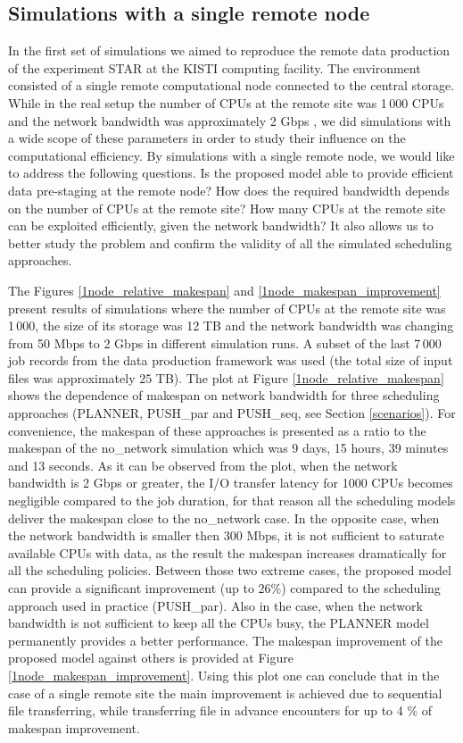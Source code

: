 \documentclass{svjour3}                     %
\begin{document}
\subsection{Simulations with a single remote node}
In the first set of simulations we aimed to reproduce the remote data production of the experiment STAR at the KISTI computing facility. The environment consisted of a single remote computational node connected to the central storage. While in the real setup the number of CPUs at the remote site was 1\,000 CPUs and the network bandwidth was approximately 2 Gbps \cite{KISTI-production}, we did simulations with a wide scope of these parameters in order to study their influence on the computational efficiency. By simulations with a single remote node, we would like to address the following questions. Is the proposed model able to provide efficient data pre-staging at the remote node? How does the required bandwidth depends on the number of CPUs at the remote site? How many CPUs at the remote site can be exploited efficiently, given the network bandwidth? It also allows us to better study the problem and confirm the validity of all the simulated scheduling approaches.


The Figures \ref{1node_relative_makespan} and \ref{1node_makespan_improvement} present results of simulations where the number of CPUs at the remote site was 1\,000, the size of its storage was 12 TB and the network bandwidth was changing from 50 Mbps to 2 Gbps in different simulation runs. A subset of the last 7\,000 job records from the data production framework was used (the total size of input files was approximately $25$ TB). The plot at Figure \ref{1node_relative_makespan} shows the dependence of makespan on network bandwidth for three scheduling approaches (PLANNER, PUSH\_par and PUSH\_seq, see Section \ref{scenarios}). For convenience, the makespan of these approaches is presented as a ratio to the makespan of the no\_network simulation which was 9 days, 15 hours, 39 minutes and 13 seconds. As it can be observed from the plot, when the network bandwidth is 2 Gbps or greater, the I/O transfer latency for 1000 CPUs becomes negligible compared to the job duration, for that reason all the scheduling models deliver the makespan close to the no\_network case. In the opposite case, when the network bandwidth is smaller then 300 Mbps, it is not sufficient to saturate available CPUs with data, as the result the makespan increases dramatically for all the scheduling policies. Between those two extreme cases, the proposed model can provide a significant improvement (up to 26\%) compared to the scheduling approach used in practice (PUSH\_par). Also in the case, when the network bandwidth is not sufficient to keep all the CPUs busy, the PLANNER model permanently provides a better performance. The makespan improvement of the proposed model against others is provided at Figure \ref{1node_makespan_improvement}. Using this plot one can conclude that in the case of a single remote site the main improvement is achieved due to sequential file transferring, while transferring file in advance encounters for up to 4 \% of makespan improvement.
\end{document}
